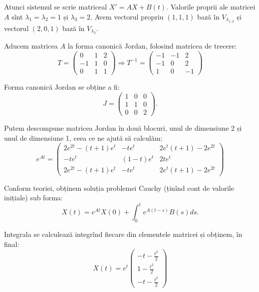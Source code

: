 \documentclass[11pt,a4paper]{article}
\theoremstyle{dotless}
\theoremstyle{dotlessdr}
\begin{document}
Atunci sistemul se scrie matriceal $X' = AX + B(t)$. Valorile proprii ale matricei $A$
sînt $\lambda_1 = \lambda_2 = 1$ și $\lambda_3 = 2$. Avem vectorul propriu $(1, 1, 1)$
bază în $V_{\lambda_{1,2}}$ și vectorul $(2, 0, 1)$ bază în $V_{\lambda_3}$.

Aducem matricea $A$ la forma canonică Jordan, folosind matricea de trecere:
\[
  T = \begin{pmatrix}
    0 & 1 & 2 \\
    -1 & 1 & 0 \\
    0 & 1 & 1
  \end{pmatrix} \Rightarrow
  T^{-1} = \begin{pmatrix}
    -1 & -1 & 2 \\
    -1 & 0 & 2 \\
    1 & 0 & -1
  \end{pmatrix}
\]

Forma canonică Jordan se obține a fi:
\[
  J = \begin{pmatrix}
    1 & 0 & 0 \\
    1 & 1 & 0 \\
    0 & 0 & 2
  \end{pmatrix}.
\]

Putem descompune matricea Jordan în două blocuri, unul de dimensiune 2 și unul de
dimensiune 1, ceea ce ne ajută să calculăm:
\[
  e^{At} = \begin{pmatrix}
    2e^{2t} - (t + 1)e^t & -te^t & 2e^t(t + 1) - 2 e^{2t} \\
    -te^t & (1 - t)e^t & 2te^t \\
    2e^{2t} - (t + 1)e^t & -te^t & 2e^t(t + 1) -2e^{2t}
  \end{pmatrix}
\]

Conform teoriei, obținem soluția problemei Cauchy (ținînd cont de valorile inițiale) sub forma:
\[
  X(t) = e^{At} X(0) + \int_0^t e^{A(t-s)} B(s) ds.
\]

Integrala se calculează integrînd fiecare din elementele matricei și obținem, în final:
\[
  X(t) = e^t \begin{pmatrix}
    -t - \frac{t^2}{2} \\
    1 - \frac{t^2}{2} \\
    -t - \frac{t^2}{2}
  \end{pmatrix}
\]
\end{document}
